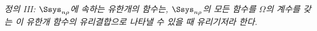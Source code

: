 
\emph{정의 III: $\Ssys_{n\rho}$에 속하는 유한개의 함수는, $\Ssys_{n\rho}$의 모든 함수를 $\Omega$의 계수를 갖는 이 유한개 함수의 유리결합으로 나타낼 수 있을 때 유리기저라 한다.}
